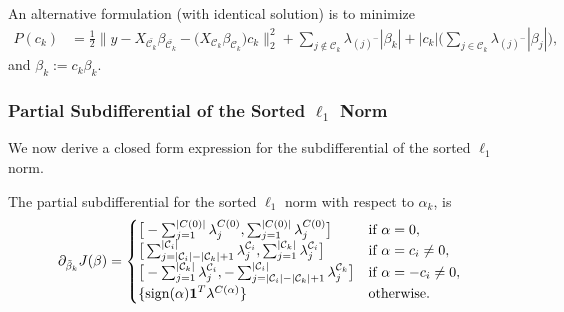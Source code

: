 An alternative formulation (with identical solution) is to minimize
\[
  \begin{aligned}
    P(c_k) & = \frac{1}{2} \lVert y - X_{\bar{\mathcal{C}_k}} \beta_{\bar{\mathcal{C}_k}} - \big(X_{\mathcal{C}_k} \beta_{\mathcal{C}_k}\big)c_k  \rVert_2^2 + \sum_{j \notin {\mathcal{C}_k}} \lambda_{(j)^-}|\beta_k| + |c_k|\bigg(\sum_{j \in {\mathcal{C}_k}} \lambda_{(j)^- }|\beta_j|\bigg),
  \end{aligned}
\]
and \(\beta_k := c_k\beta_k\).

\subsubsection{Partial Subdifferential of the Sorted \(\ell_1\) Norm}

We now derive a closed form expression for the subdifferential
of the sorted \(\ell_1\) norm.
\begin{theorem}
  \label{thm:cluster-subdifferential}
  The partial subdifferential for the sorted \(\ell_1\) norm with respect
  to \(\alpha_k\), is
  \[
    \partial_{\tilde \beta_k}  J(\beta)       =
    \begin{cases}
      \big[-\sum_{j=1}^{|C(0)|}\lambda^{C(0)}_j, \sum_{j=1}^{|C(0)|}\lambda^{C(0)}_j\big]                                                                        & \text{if } \alpha = 0,           \\
      \big[\sum_{j=|\mathcal{C}_i| - |\mathcal{C}_k|+1}^{|\mathcal{C}_i|}\lambda^{\mathcal{C}_i}_j, \sum_{j=1}^{|\mathcal{C}_k|}\lambda^{\mathcal{C}_i}_j\big]   & \text{if } \alpha = c_i \neq 0,  \\
      \big[-\sum_{j=1}^{|\mathcal{C}_k|}\lambda^{\mathcal{C}_i}_j, -\sum_{j=|\mathcal{C}_i| - |\mathcal{C}_k|+1}^{|\mathcal{C}_i|}\lambda^{\mathcal{C}_k}_j\big] & \text{if } \alpha = -c_i \neq 0, \\
      \{\operatorname{sign}(\alpha)\boldsymbol{1}^T\lambda^{C(\alpha)}\}                                                                                                       & \text{otherwise.
      }
    \end{cases}
  \]
\end{theorem}
